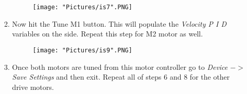 \documentclass[12pt]{article}
\begin{document}
\begin{enumerate}
\begin{enumerate}
		\begin{figure}[H]
	 		\centering
			\texttt{[image: "Pictures/is7".PNG]}
	 		\caption{}
		\end{figure}

		\item Now hit the Tune M1 button. This will populate the \textit{Velocity P I D} variables on the side. Repeat this step for M2 motor as well.

		\begin{figure}[H]
	 		\centering
			\texttt{[image: "Pictures/is9".PNG]}
	 		\caption{}
		\end{figure}
	
		\item Once both motors are tuned from this motor controller go to \textit{Device $->$ Save Settings} and then exit. Repeat all of steps 6 and 8 for the other drive motors. 
	\end{enumerate}


\end{enumerate}
\end{document}
